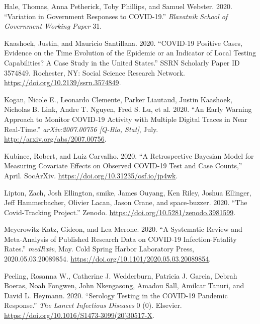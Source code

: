 \documentclass[10pt,letterpaper]{article}
\begin{document}
\leavevmode\hypertarget{ref-haleVariationGovernmentResponses2020}{}%
Hale, Thomas, Anna Petherick, Toby Phillips, and Samuel Webster. 2020.
``Variation in Government Responses to COVID-19.'' \emph{Blavatnik
School of Government Working Paper} 31.

\leavevmode\hypertarget{ref-kaashoekCOVID19PositiveCases2020a}{}%
Kaashoek, Justin, and Mauricio Santillana. 2020. ``COVID-19 Positive
Cases, Evidence on the Time Evolution of the Epidemic or an Indicator of
Local Testing Capabilities? A Case Study in the United States.'' SSRN
Scholarly Paper ID 3574849. Rochester, NY: Social Science Research
Network. \url{https://doi.org/10.2139/ssrn.3574849}.

\leavevmode\hypertarget{ref-koganEarlyWarningApproach2020}{}%
Kogan, Nicole E., Leonardo Clemente, Parker Liautaud, Justin Kaashoek,
Nicholas B. Link, Andre T. Nguyen, Fred S. Lu, et al. 2020. ``An Early
Warning Approach to Monitor COVID-19 Activity with Multiple Digital
Traces in Near Real-Time.'' \emph{arXiv:2007.00756 {[}Q-Bio, Stat{]}},
July. \url{http://arxiv.org/abs/2007.00756}.

\leavevmode\hypertarget{ref-kubinecRetrospectiveBayesianModel2020}{}%
Kubinec, Robert, and Luiz Carvalho. 2020. ``A Retrospective Bayesian
Model for Measuring Covariate Effects on Observed COVID-19 Test and Case
Counts,'' April. SocArXiv. \url{https://doi.org/10.31235/osf.io/jp4wk}.

\leavevmode\hypertarget{ref-zachliptonCovidTrackingProject2020}{}%
Lipton, Zach, Josh Ellington, smike, James Ouyang, Ken Riley, Joshua
Ellinger, Jeff Hammerbacher, Olivier Lacan, Jason Crane, and
space-buzzer. 2020. ``The Covid-Tracking Project.'' Zenodo.
\url{https://doi.org/10.5281/zenodo.3981599}.

\leavevmode\hypertarget{ref-meyerowitz-katzSystematicReviewMetaanalysis2020}{}%
Meyerowitz-Katz, Gideon, and Lea Merone. 2020. ``A Systematic Review and
Meta-Analysis of Published Research Data on COVID-19 Infection-Fatality
Rates.'' \emph{medRxiv}, May. Cold Spring Harbor Laboratory Press,
2020.05.03.20089854. \url{https://doi.org/10.1101/2020.05.03.20089854}.

\leavevmode\hypertarget{ref-peelingSerologyTestingCOVID192020}{}%
Peeling, Rosanna W., Catherine J. Wedderburn, Patricia J. Garcia, Debrah
Boeras, Noah Fongwen, John Nkengasong, Amadou Sall, Amilcar Tanuri, and
David L. Heymann. 2020. ``Serology Testing in the COVID-19 Pandemic
Response.'' \emph{The Lancet Infectious Diseases} 0 (0). Elsevier.
\url{https://doi.org/10.1016/S1473-3099(20)30517-X}.
\end{document}

